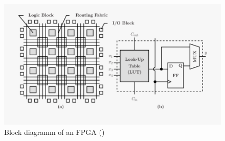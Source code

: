 \begin{figure}
    \centering
    \includegraphics[width=\linewidth]{images/fpga-block-diagram.png}
    \caption{Block diagramm of an FPGA (\cite{fpga_block})}
    \label{fig:fpga_block}
\end{figure}

